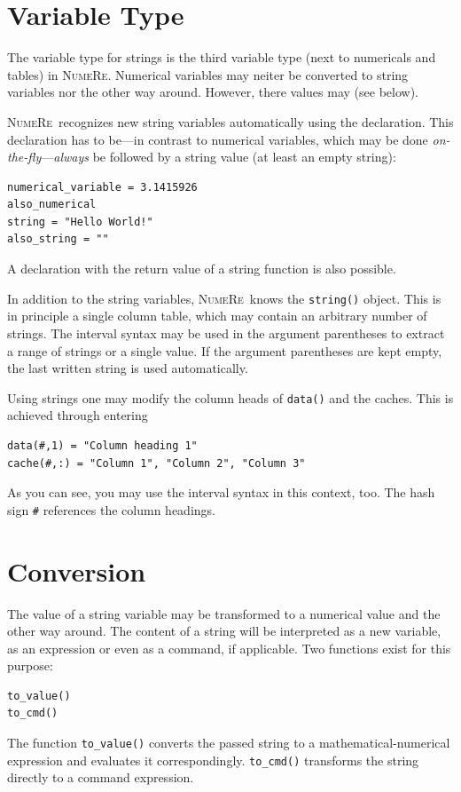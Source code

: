 \documentclass[DIV=14,headsepline,footsepline]{scrbook}
\newcommand{\NR}{\textsc{Nu\-me\-Re}}
\begin{document}
			\section{Variable Type}
				The variable type for strings is the third variable type (next to numericals and tables) in \NR. Numerical variables may neiter be converted to string variables nor the other way around. However, there values may (see below).
				
				\NR\ recognizes new string variables automatically using the declaration. This declaration has to be---in contrast to numerical variables, which may be done \emph{on-the-fly}---\emph{always} be followed by a string value (at least an empty string):
				\begin{lstlisting}
numerical_variable = 3.1415926
also_numerical
string = "Hello World!"
also_string = ""
				\end{lstlisting}
				A declaration with the return value of a string function is also possible.
				
				In addition to the string variables, \NR\ knows the \verb+string()+ object. This is in principle a single column table, which may contain an arbitrary number of strings. The interval syntax may be used in the argument parentheses to extract a range of strings or a single value. If the argument parentheses are kept empty, the last written string is used automatically.
				
				Using strings one may modify the column heads of \verb+data()+ and the caches. This is achieved through entering
				\begin{lstlisting}
data(#,1) = "Column heading 1"
cache(#,:) = "Column 1", "Column 2", "Column 3"
				\end{lstlisting}
				As you can see, you may use the interval syntax in this context, too. The hash sign \verb+#+ references the column headings.
				
			\section{Conversion}
				The value of a string variable may be transformed to a numerical value and the other way around. The content of a string will be interpreted as a new variable, as an expression or even as a command, if applicable. Two functions exist for this purpose:
				\begin{lstlisting}
to_value()
to_cmd()
				\end{lstlisting}
				The function \verb+to_value()+ converts the passed string to a ma\-the\-ma\-tic\-al-nu\-me\-ri\-cal expression and evaluates it correspondingly. \verb+to_cmd()+ transforms the string directly to a command expression.
				
\end{document}
